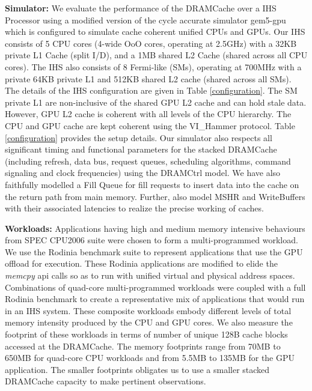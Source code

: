 \par \textbf{Simulator:} We evaluate the performance of the DRAMCache over a IHS Processor using a modified version of the cycle accurate simulator gem5-gpu \cite{gem5-gpu} which is configured to simulate cache coherent unified CPUs and GPUs. 
Our IHS consists of 5 CPU cores (4-wide OoO cores, operating at 2.5GHz) with a 32KB private L1 Cache (split I/D), and a 1MB shared L2 Cache (shared across all CPU cores). The IHS also consists of 8 Fermi-like (SMs), operating at 700MHz with a private 64KB private L1 and 512KB shared L2 cache (shared across all SMs). The details of the IHS configuration are given in Table \ref{configuration}. The SM private L1 are non-inclusive of the shared GPU L2 cache and can hold stale data. However, GPU L2 cache is coherent with all levels of the CPU hierarchy. The CPU and GPU cache are kept coherent using the VI\_Hammer protocol\cite{gem5-gpu}. Table \ref{configuration} provides the setup details. 
Our simulator also respects all significant timing and functional parameters for the stacked DRAMCache (including refresh, data bus, request queues, scheduling algorithms, command signaling and clock frequencies) using the DRAMCtrl \cite{dramctrl} model. We have also faithfully modelled  a Fill Queue \cite{dca} for fill requests to insert data into the cache on the return path from main memory. Further, also model MSHR and WriteBuffers with their associated latencies to realize the precise working of caches. 

\par \textbf{Workloads:} Applications having high and medium memory intensive behaviours from SPEC CPU2006 suite \cite{spec2006} were chosen to form a multi-programmed workload. We use the Rodinia benchmark suite \cite{rodinia} to represent applications that use the GPU offload for execution. These Rodinia applications are modified to elide the \textit{memcpy} api calls so as to run with unified virtual and physical address spaces. Combinations of quad-core multi-programmed workloads were coupled with a full Rodinia benchmark to create a representative mix of applications that would run in an IHS system. These composite workloads embody different levels of total memory intensity produced by the CPU and GPU cores. We also measure the footprint of these workloads in terms of number of unique 128B cache blocks accessed at the DRAMCache. The memory footprints range from 70MB to 650MB for quad-core CPU workloads and from 5.5MB to 135MB for the GPU application. The smaller footprints obligates us to use a smaller stacked DRAMCache capacity to make pertinent observations.\\

